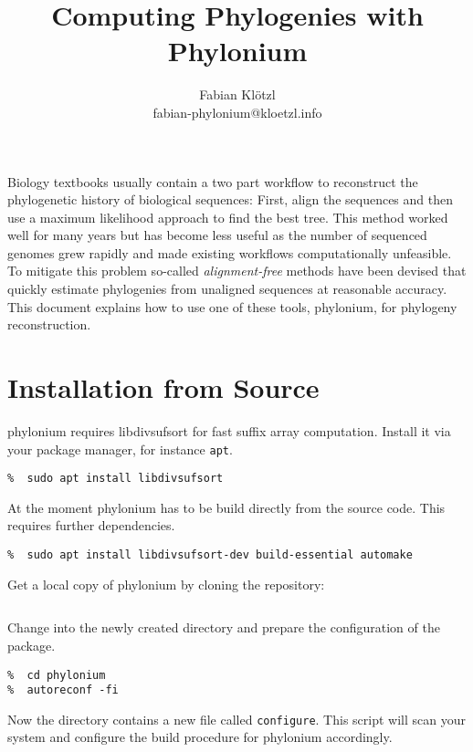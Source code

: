 \documentclass[a4paper,10pt,english]{scrartcl}
\title{Computing Phylogenies with Phylonium}
\author{Fabian Klötzl\\\normalsize{fabian-phylonium@kloetzl.info}}
\date{\isodate{\today}}
\newcommand{\tool}[1]{\textsf{#1}}
\newcommand{\phylonium}{\textsf{phylonium}\xspace}
\begin{document}
\frenchspacing
\maketitle


Biology textbooks usually contain a two part workflow to reconstruct the phylogenetic history of biological sequences: %
First, align the sequences and then use a maximum likelihood approach to find the best tree. This method worked well for many years but has become less useful as the number of sequenced genomes grew rapidly and made existing workflows computationally unfeasible. To mitigate this problem so-called \emph{alignment-free} methods have been devised that quickly estimate phylogenies from unaligned sequences at reasonable accuracy. This document explains how to use one of these tools, \phylonium, for phylogeny reconstruction. 

\section{Installation from Source}

\phylonium requires \tool{libdivsufsort} for fast suffix array computation. Install it via your package manager, for instance \lstinline!apt!.

\begin{lstlisting}
%  sudo apt install libdivsufsort
\end{lstlisting}

At the moment \phylonium has to be build directly from the source code. This requires further dependencies.

\begin{lstlisting}
%  sudo apt install libdivsufsort-dev build-essential automake
\end{lstlisting}

Get a local copy of \phylonium by cloning the repository:

\begin{lstlisting}[language=bash]
%  git clone https://github.com/evolbioinf/phylonium
\end{lstlisting}

Change into the newly created directory and prepare the configuration of the package.

\begin{lstlisting}
%  cd phylonium
%  autoreconf -fi
\end{lstlisting}

Now the directory contains a new file called \lstinline!configure!. This script will scan your system and configure the build procedure for \phylonium accordingly.
\end{document}
